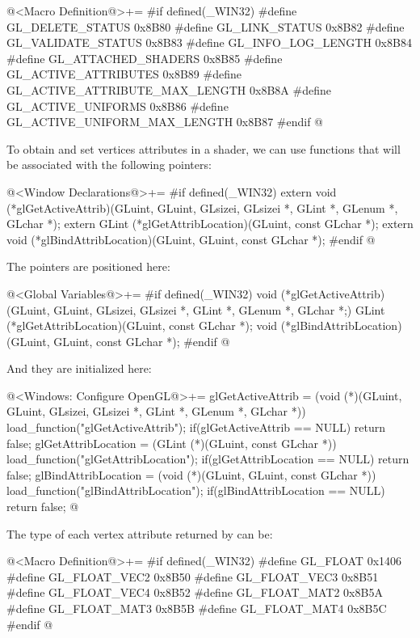 \iniciocodigo
@<Macro Definition@>+=
#if defined(_WIN32)
#define GL_DELETE_STATUS               0x8B80
#define GL_LINK_STATUS                 0x8B82
#define GL_VALIDATE_STATUS             0x8B83
#define GL_INFO_LOG_LENGTH             0x8B84
#define GL_ATTACHED_SHADERS            0x8B85
#define GL_ACTIVE_ATTRIBUTES           0x8B89
#define GL_ACTIVE_ATTRIBUTE_MAX_LENGTH 0x8B8A
#define GL_ACTIVE_UNIFORMS             0x8B86
#define GL_ACTIVE_UNIFORM_MAX_LENGTH   0x8B87
#endif
@
\fimcodigo

To obtain and set vertices attributes in a shader, we can use
functions that will be associated with the following pointers:

\iniciocodigo
@<Window Declarations@>+=
#if defined(_WIN32)
extern void (*glGetActiveAttrib)(GLuint, GLuint, GLsizei, GLsizei *, GLint *,
                                 GLenum *, GLchar *);
extern GLint (*glGetAttribLocation)(GLuint, const GLchar *);
extern void (*glBindAttribLocation)(GLuint, GLuint, const GLchar *);
#endif
@
\fimcodigo

The pointers are positioned here:

\iniciocodigo
@<Global Variables@>+=
#if defined(_WIN32)
void (*glGetActiveAttrib)(GLuint, GLuint, GLsizei, GLsizei *, GLint *,
                                 GLenum *, GLchar *;)
GLint (*glGetAttribLocation)(GLuint, const GLchar *);
void (*glBindAttribLocation)(GLuint, GLuint, const GLchar *);
#endif
@
\fimcodigo

And they are initialized here:

\iniciocodigo
@<Windows: Configure OpenGL@>+=
glGetActiveAttrib = (void (*)(GLuint, GLuint, GLsizei, GLsizei *, GLint *,
                     GLenum *, GLchar *)) load_function("glGetActiveAttrib");
if(glGetActiveAttrib == NULL) return false;
glGetAttribLocation = (GLint (*)(GLuint, const GLchar *))
                           load_function("glGetAttribLocation");
if(glGetAttribLocation == NULL) return false;
glBindAttribLocation = (void (*)(GLuint, GLuint, const GLchar *))
                              load_function("glBindAttribLocation");
if(glBindAttribLocation == NULL) return false;
@
\fimcodigo

The type of each vertex attribute returned
by  can be:

\iniciocodigo
@<Macro Definition@>+=
#if defined(_WIN32)
#define GL_FLOAT      0x1406
#define GL_FLOAT_VEC2 0x8B50
#define GL_FLOAT_VEC3 0x8B51
#define GL_FLOAT_VEC4 0x8B52
#define GL_FLOAT_MAT2 0x8B5A
#define GL_FLOAT_MAT3 0x8B5B
#define GL_FLOAT_MAT4 0x8B5C
#endif
@
\fimcodigo

